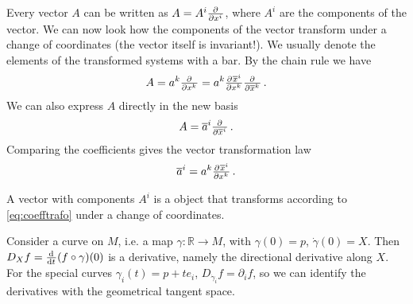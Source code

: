 Every vector $A$ can be written as $A=A^i\pd{}{{x^i}}$, where $A^i$ are the
components of the vector. We can now look how the components of the vector
transform under a change of coordinates (the vector itself is invariant!). 
We usually denote the elements of the transformed systems with a bar.
By the chain rule we have
\begin{equation}
    A= a^k\pd{}{{x^k}}= a^k\pd{\overline{x}^i}{{x^k}}\pd{}{{\overline{x}^k}}\, .
\end{equation}
We can also express $A$ directly in the new basis
\begin{equation}
    A= \overline{a}^i\pd{}{{\overline{x}^i}}\, .
\end{equation}
Comparing the coefficients gives the vector transformation law
\begin{equation}
    \overline{a}^i=a^k\pd{\overline{x}^i}{{x^k}}\label{eq:coefftrafo}\, .
\end{equation}
\begin{definition} A vector with components $A^i$ is a object that transforms according
to \ref{eq:coefftrafo} under a change of coordinates.
\end{definition}
Consider a curve on $M$, i.e. a map $\gamma:\mathbb{R}\to M$, with
$\gamma(0)=p$, $\dot{\gamma}(0)=X$. Then $D_X f=\od{}{t}(f\circ\gamma)(0)$ is
a derivative, namely the directional derivative along $X$.
For the special curves $\gamma_i(t)=p+te_i$, 
$D_{\dot{\gamma}_i} f=\partial_if$, so we can identify the derivatives with
the geometrical tangent space.

